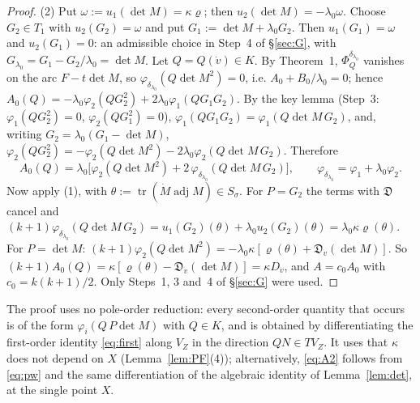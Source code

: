 \documentclass[11pt]{article}
\numberwithin{equation}{section}
\theoremstyle{remark}
\newcommand{\VZ}{V_Z}
\newcommand{\lz}{\lambda_0}
\begin{document}
\begin{proof}
(2) Put $\omega:=u_1(\det M)=\kappa\varrho$; then $u_2(\det M)=-\lz\omega$. Choose $G_2\in T_1$ with $u_2(G_2)=\omega$
and put $G_1:=\det M+\lz G_2$. Then $u_1(G_1)=\omega$ and $u_2(G_1)=0$: an admissible choice in Step~4 of
\S\ref{sec:G}, with $G_{\lz}=G_1-G_2/\lz=\det M$. Let $Q=Q(\dot v)\in K$. By Theorem~1, $\Phi^{\delta_{\lz}}_Q$ vanishes
on the arc $F-t\det M$, so $\varphi_{\delta_{\lz}}(Q\det M^2)=0$, i.e. $A_0+B_0/\lz=0$; hence
$A_0(Q)=-\lz\varphi_2(QG_2^2)+2\lz\varphi_1(QG_1G_2)$. By the key lemma (Step~3: $\varphi_1(QG_2^2)=0$,
$\varphi_2(QG_1^2)=0$),
$\varphi_1(QG_1G_2)=\varphi_1(Q\det M\,G_2)$, and, writing $G_2=\lz(G_1-\det M)$,
$\varphi_2(QG_2^2)=-\varphi_2(Q\det M^2)-2\lz\varphi_2(Q\det M\,G_2)$. Therefore
\[
A_0(Q)=\lz\bigl[\varphi_2(Q\det M^2)+2\,\varphi_{\delta_{\lz}}(Q\det M\,G_2)\bigr],\qquad
\varphi_{\delta_{\lz}}=\varphi_1+\lz\varphi_2 .
\]
Now apply (1), with $\theta:=\operatorname{tr}(\dot M\operatorname{adj}M)\in S_\sigma$. For $P=G_2$ the terms with
$\mathfrak D$ cancel and $(k+1)\varphi_{\delta_{\lz}}(Q\det M\,G_2)=u_1(G_2)(\theta)+\lz u_2(G_2)(\theta)=\lz\kappa\varrho(\theta)$.
For $P=\det M$: $(k+1)\varphi_2(Q\det M^2)=-\lz\kappa[\varrho(\theta)+\mathfrak D_{\dot v}(\det M)]$. So
$(k+1)A_0(Q)=\kappa[\varrho(\theta)-\mathfrak D_{\dot v}(\det M)]=\kappa D_{\dot v}$, and $A=c_0A_0$ with
$c_0=k(k+1)/2$. Only Steps~1, 3 and~4 of \S\ref{sec:G} were used.
\end{proof}

The proof uses no pole-order reduction: every second-order quantity that occurs is of the form
$\varphi_i(Q\,P\det M)$ with $Q\in K$, and is obtained by differentiating the first-order identity
\eqref{eq:first} along $\VZ$ in the direction $Q N\in T\VZ$. It uses that $\kappa$ does not depend on $X$
(Lemma~\ref{lem:PF}(4)); alternatively, \eqref{eq:A2} follows from \eqref{eq:pw} and the same differentiation of the
algebraic identity of Lemma~\ref{lem:det}, at the single point $X$.
\end{document}
